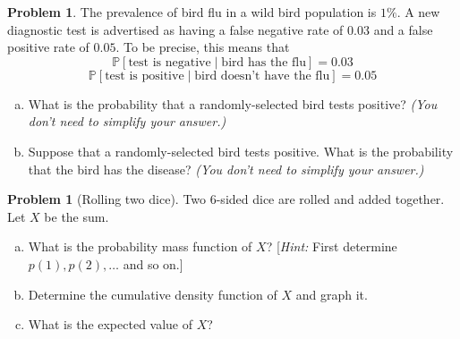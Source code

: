 \documentclass[10pt]{article}
\theoremstyle{definition}
\newtheorem{problem}[theorem]{Problem}
\newcommand{\1}[1]{\textbf{1}_{\left[#1\right]}} %
\def\P{\mathbb{P}} %
\begin{document}
\begin{problem}%
  The prevalence of bird flu in a wild bird population is $1\%$. A new diagnostic test is advertised as
  having a false negative rate of $0.03$ and a false positive rate of $0.05$. To be precise, this means
  that
  \begin{equation*}
    \P\left[\text{test is negative}\mid \text{bird has the flu} \right] = 0.03
  \end{equation*}
  \begin{equation*}
    \P\left[\text{test is positive}\mid \text{bird doesn't have the flu} \right] = 0.05
  \end{equation*}
  \begin{enumerate}[(a)]
    \item What is the probability that a randomly-selected bird tests positive? \textit{(You don't need to
      simplify your answer.)}
    \item Suppose that a randomly-selected bird tests positive. What is the probability that the bird has
    the disease? \textit{(You don't need to simplify your answer.)}
  \end{enumerate}
\end{problem}






\newpage
\begin{problem}[Rolling two dice]
  Two 6-sided dice are rolled and added together. Let $X$ be the sum. 
  \begin{enumerate}[(a)]
    \item What is the probability mass function of $X$? [\textit{Hint:} First determine $p(1),p(2),\ldots$ and so on.]
    \item Determine the cumulative density function of $X$ and graph it.
    \item What is the expected value of $X$?
  \end{enumerate}
\end{problem}
\end{document}
